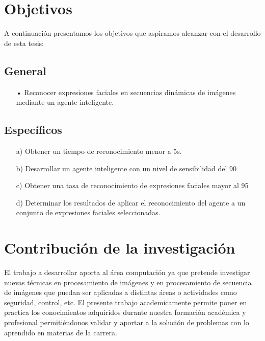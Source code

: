 \section{Objetivos}
A continuación presentamos los objetivos que aspiramos alcanzar con el desarrollo de esta tesis:

\subsection{General}
\begin{enumerate}
\item[•] Reconocer expresiones faciales en secuencias dinámicas de imágenes mediante un
agente inteligente.
\end{enumerate}
\vskip 0.3cm


\subsection{Específicos}

\begin{enumerate}
\item[a)] Obtener un tiempo de reconocimiento menor a 5s.
\item[b)] Desarrollar un agente inteligente con un nivel de sensibilidad del 90%
\item[c)] Obtener una tasa de reconocimiento de expresiones faciales mayor al 95%
\item[d)] Determinar los resultados de aplicar el reconocimiento del agente a un conjunto de
expresiones faciales seleccionadas.
\end{enumerate}

\section{Contribución de la investigación}

El trabajo a desarrollar aporta al área computación ya que pretende investigar nuevas técnicas
en procesamiento de imágenes y en procesamiento de secuencia de imágenes que puedan
ser aplicadas a distintas áreas o actividades como seguridad, control, etc.
\vskip 0.3cm
El presente trabajo academicamente permite poner en practica los conocimientos adquiridos
durante nuestra formación académica y profesional permitiéndonos validar y aportar a la
solución de problemas con lo aprendido en materias de la carrera. 

